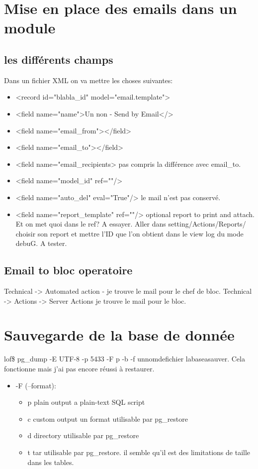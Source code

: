 \documentclass[12pt,a4paper]{article}
\begin{document}
\section{Mise en place des emails dans un module}
\label{sec:email}

\subsection{les différents champs}
\label{sec:fields_email}
Dans un fichier XML on va mettre les choses suivantes:

\begin{itemize}
\item <record id="blabla_id" model="email.template">
\item <field name="name">Un non - Send by Email</>
\item <field name="email_from"></field>
\item <field name="email_to"></field>
\item <field name="email_recipients> pas compris la différence avec email_to.
\item <field name="model_id" ref=""/>
\item <field name="auto_del" eval="True"/> le mail n'est pas conservé.
\item <field name="report_template" ref=""/> optional report to print and attach. Et on met quoi dans le ref? A essayer. Aller dans setting/Actions/Reports/ choisir son report et mettre l'ID que l'on obtient dans le view log du mode debuG. A tester.  
\end{itemize}

\subsection{Email to bloc operatoire}
\label{sec:emailbloc}

Technical -> Automated action -  je trouve le mail pour le chef de bloc. 
Technical  -> Actions -> Server Actions je trouve le mail pour le bloc.

\section{Sauvegarde de la base de donnée}
\label{sec:save_db}

lof\$ pg_dump -E UTF-8 -p 5433 -F p -b -f unnomdefichier labaseasauver. Cela fonctionne mais j'ai pas encore réussi à restaurer.

\begin{itemize}
\item -F (--format):
\begin{itemize}
\item p plain output a plain-text SQL script
\item c custom output un format utilisable par pg_restore
\item d directory utilisable par pg_restore
\item t tar utilisable par pg_restore. il semble qu'il est des limitations de taille dans les tables.
\end{itemize}
\end{itemize}
\end{document}
